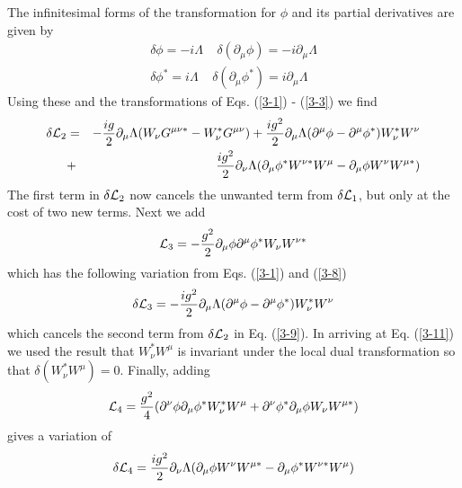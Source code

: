 \documentclass[a4paper,aps]{revtex4}
\begin{document}
The infinitesimal forms of the transformation
for $\phi$ and its partial derivatives are given by
\begin{eqnarray}
\label{3-8}
\delta \phi = - i \Lambda \; \; \; \;
\delta (\partial _{\mu} \phi) = - i \partial _{\mu} \Lambda
\\
\delta \phi ^{\ast} =  i \Lambda \; \; \; \;
\delta (\partial _{\mu} \phi ^{\ast}) =  i \partial _{\mu} \Lambda
\nonumber
\end{eqnarray}
Using these and the transformations of Eqs.
(\ref{3-1}) - (\ref{3-3}) we find
\begin{eqnarray}
\label{3-9}
\delta {\cal L} _2 &=& -\frac{i g}{2} \partial _{\mu} \Lambda
(W_{\nu} G^{\mu \nu \ast} -W_{\nu} ^{\ast} G^{\mu \nu})
+ \frac{i g^2}{2} \partial _{\mu} \Lambda (\partial ^{\mu} \phi
- \partial ^{\mu} \phi ^{\ast}) W_{\nu} ^{\ast} W^{\nu}
\nonumber \\
&+&\frac{i g^2}{2} \partial _{\nu} \Lambda (\partial _{\mu} \phi ^{\ast}
W^{\nu \ast} W^{\mu} -\partial _{\mu} \phi W^{\nu} W^{\mu \ast}) 
\end{eqnarray}
The first term in $\delta {\cal L} _2$ now cancels the
unwanted term from $\delta {\cal L} _1$, but only at the
cost of two new terms. Next we add
\begin{equation}
\label{3-10}
{\cal L}_3 = -\frac{g^2}{2} \partial _{\mu} \phi \partial ^{\mu}
\phi ^{\ast} W_{\nu} W^{\nu \ast}
\end{equation}
which has the following variation from Eqs.
(\ref{3-1}) and (\ref{3-8})
\begin{equation}
\label{3-11}
\delta {\cal L} _3 = -\frac{i g^2}{2} \partial _{\mu} \Lambda 
(\partial ^{\mu} \phi - \partial ^{\mu} \phi ^{\ast})
W_{\nu} ^{\ast} W^{\nu} 
\end{equation}
which cancels the second term from $\delta {\cal L} _2$
in Eq. (\ref{3-9}). In arriving at Eq. (\ref{3-11}) we used
the result that $W_{\nu} ^{\ast} W^{\mu}$ is invariant under
the local dual transformation so that $\delta (W_{\nu} ^{\ast}
W^{\mu}) = 0$. Finally, adding
\begin{equation}
\label{3-12}
{\cal L}_4 = \frac{g^2}{4} (\partial ^{\nu} \phi \partial _{\mu}
\phi ^{\ast} W_{\nu} ^{\ast} W^{\mu} +
\partial ^{\nu} \phi ^{\ast} \partial _{\mu}
\phi W_{\nu} W^{\mu \ast})
\end{equation}
gives a variation of
\begin{equation}
\label{3-13}
\delta {\cal L} _4 =\frac{i g^2}{2} \partial _{\nu} \Lambda
(\partial _{\mu} \phi W^{\nu} W^{\mu \ast} -
\partial _{\mu} \phi ^{\ast} W^{\nu \ast} W^{\mu} )
\end{equation}
\end{document}
